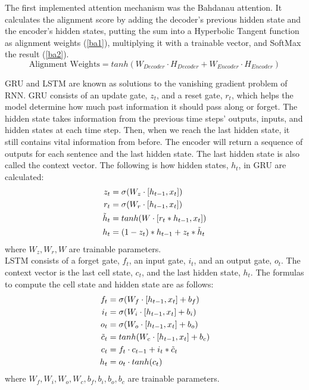 \documentclass[conference]{IEEEtran}
\begin{document}
\indent The first implemented attention mechanism was the Bahdanau attention. It calculates the alignment score by adding the decoder’s previous hidden state and the encoder’s hidden states, putting the sum into a Hyperbolic Tangent function as alignment weights (\ref{ba1}), multiplying it with a trainable vector, and SoftMax the result (\ref{ba2}).
\begin{equation}
    \label{ba1}
    \text{Alignment Weights} = tanh(W_{Decoder} \cdot H_{Decoder} + W_{Encoder} \cdot H_{Encoder})
\end{equation}  

\indent GRU and LSTM are known as solutions to the vanishing gradient problem of RNN. GRU consists of an update gate, $z_t$, and a reset gate, $r_t$, which helps the model determine how much past information it should pass along or forget. The hidden state takes information from the previous time steps’ outputs, inputs, and hidden states at each time step. Then, when we reach the last hidden state, it still contains vital information from before. The encoder will return a sequence of outputs for each sentence and the last hidden state. The last hidden state is also called the context vector. The following is how hidden states, $h_t$, in GRU are calculated: 
\begin{align}
z_t &= \sigma(W_z \cdot [h_{t-1},x_t]) \\
r_t &= \sigma(W_r \cdot [h_{t-1},x_t]) \\
\Tilde{h}_t &= tanh(W\cdot [r_t*h_{t-1},x_t]) \\
h_t &=(1-z_t)*h_{t-1}+z_t*\Tilde{h}_t 
\end{align}
where $W_z, W_r, W$ are trainable parameters. \\
\indent LSTM consists of a forget gate, $f_t$, an input gate, $i_t$, and an output gate, $o_t$. The context vector is the last cell state, $c_t$, and the last hidden state, $h_t$. The formulas to compute the cell state and hidden state are as follows:
\begin{align}
f_t &=\sigma(W_f\cdot [h_{t-1},x_t] +b_f) \\
i_t &=\sigma(W_i\cdot [h_{t-1},x_t] +b_i) \\
o_t &=\sigma(W_o\cdot [h_{t-1},x_t] +b_o) \\
\Tilde{c}_t &= tanh(W_c \cdot [h_{t-1},x_t] +b_c) \\
c_t &= f_t \cdot c_{t-1} + i_t*\Tilde{c}_t \\
h_t &= o_t \cdot tanh(c_t) 
\end{align}
where $W_f, W_i, W_o, W_c, b_f, b_i, b_o, b_c$ are trainable parameters.
\end{document}

